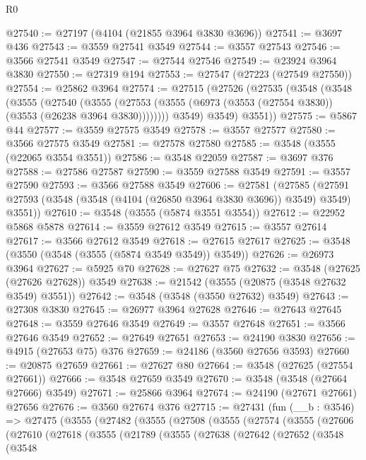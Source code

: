 \begin{lexlean}{R0}
\begin{coremodule}
@27540 := @27197 (@4104 (@21855 @3964 @3830 @3696))
@27541 := @3697 @436
@27543 := @3559 @27541 @3549
@27544 := @3557 @27543
@27546 := @3566 @27541 @3549
@27547 := @27544 @27546
@27549 := @23924 @3964 @3830
@27550 := @27319 @194
@27553 := @27547 (@27223 (@27549 @27550))
@27554 := @25862 @3964
@27574 := @27515
    (@27526
      (@27535
        (@3548
          (@3548
            (@3555
              (@27540
                (@3555
                  (@27553 (@3555 (@6973 (@3553 (@27554 @3830)) (@3553 (@26238 @3964 @3830))))))))
            @3549)
          @3549)
        @3551))
@27575 := @5867 @44
@27577 := @3559 @27575 @3549
@27578 := @3557 @27577
@27580 := @3566 @27575 @3549
@27581 := @27578 @27580
@27585 := @3548 (@3555 (@22065 @3554 @3551))
@27586 := @3548 @22059
@27587 := @3697 @376
@27588 := @27586 @27587
@27590 := @3559 @27588 @3549
@27591 := @3557 @27590
@27593 := @3566 @27588 @3549
@27606 := @27581
    (@27585 (@27591 @27593 (@3548 (@3548 (@4104 (@26850 @3964 @3830 @3696)) @3549) @3549) @3551))
@27610 := @3548 (@3555 (@5874 @3551 @3554))
@27612 := @22952 @5868 @5878
@27614 := @3559 @27612 @3549
@27615 := @3557 @27614
@27617 := @3566 @27612 @3549
@27618 := @27615 @27617
@27625 := @3548 (@3550 (@3548 (@3555 (@5874 @3549 @3549)) @3549))
@27626 := @26973 @3964
@27627 := @5925 @70
@27628 := @27627 @75
@27632 := @3548 (@27625 (@27626 @27628)) @3549
@27638 := @21542 (@3555 (@20875 (@3548 @27632 @3549) @3551))
@27642 := @3548 (@3548 (@3550 @27632) @3549)
@27643 := @27308 @3830
@27645 := @26977 @3964 @27628
@27646 := @27643 @27645
@27648 := @3559 @27646 @3549
@27649 := @3557 @27648
@27651 := @3566 @27646 @3549
@27652 := @27649 @27651
@27653 := @24190 @3830
@27656 := @4915 (@27653 @75) @376
@27659 := @24186 (@3560 @27656 @3593)
@27660 := @20875 @27659
@27661 := @27627 @80
@27664 := @3548 (@27625 (@27554 @27661))
@27666 := @3548 @27659 @3549
@27670 := @3548 (@3548 (@27664 @27666) @3549)
@27671 := @25866 @3964
@27674 := @24190 (@27671 @27661) @27656
@27676 := @3560 @27674 @376
@27715 := @27431
    (fun (__b : @3546) =>
    @27475
      (@3555
        (@27482
          (@3555
            (@27508
              (@3555
                (@27574
                  (@3555
                    (@27606
                      (@27610
                        (@27618
                          (@3555
                            (@21789
                              (@3555
                                (@27638
                                  (@27642
                                    (@27652
                                      (@3548
                                        (@3548

\end{coremodule}
\end{lexlean}
